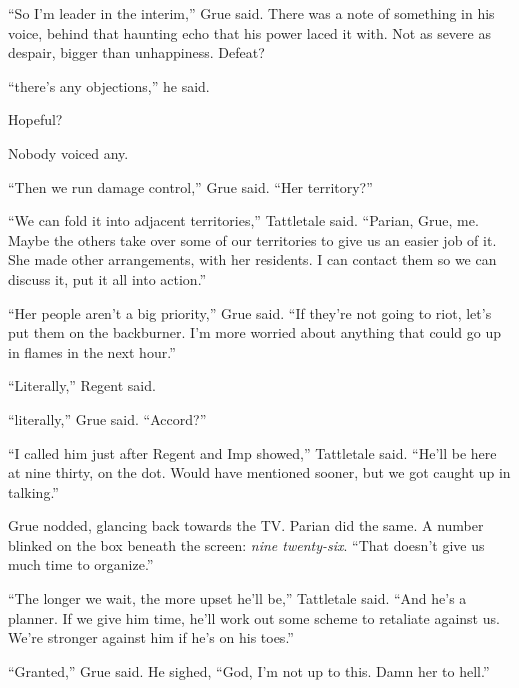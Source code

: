 ``So I'm leader in the interim,'' Grue said.  There was a note of something in his voice, behind that haunting echo that his power laced it with.  Not as severe as despair, bigger than unhappiness.  Defeat?



``\ldotsUnless there's any objections,'' he said.



Hopeful?



Nobody voiced any.



``Then we run damage control,'' Grue said.  ``Her territory?''



``We can fold it into adjacent territories,'' Tattletale said.  ``Parian, Grue, me.  Maybe the others take over some of our territories to give us an easier job of it.  She made other arrangements, with her residents.  I can contact them so we can discuss it, put it all into action.''



``Her people aren't a big priority,'' Grue said.  ``If they're not going to riot, let's put them on the backburner.  I'm more worried about anything that could go up in flames in the next hour.''



``Literally,'' Regent said.



``\ldotsPossibly literally,'' Grue said.  ``Accord?''



``I called him just after Regent and Imp showed,'' Tattletale said.  ``He'll be here at nine thirty, on the dot.  Would have mentioned sooner, but we got caught up in talking.''



Grue nodded, glancing back towards the TV.  Parian did the same.  A number blinked on the box beneath the screen: \emph{nine twenty-six}.  ``That doesn't give us much time to organize.''



``The longer we wait, the more upset he'll be,'' Tattletale said.  ``And he's a planner.  If we give him time, he'll work out some scheme to retaliate against us.  We're stronger against him if he's on his toes.''



``Granted,'' Grue said.  He sighed, ``God, I'm not up to this.  Damn her to hell.''



